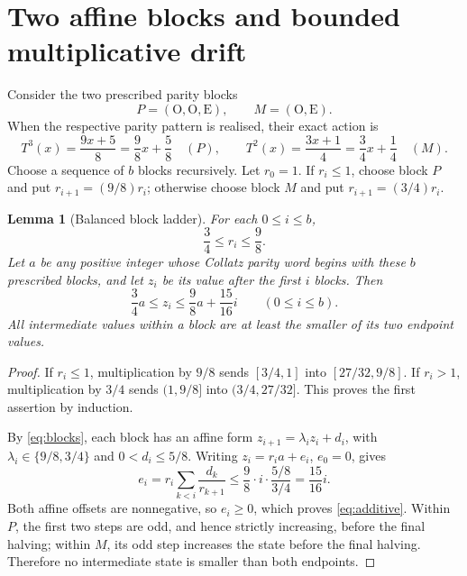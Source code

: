 \documentclass[11pt,a4paper]{article}
\newtheorem{lemma}[theorem]{Lemma}
\begin{document}
\section{Two affine blocks and bounded multiplicative drift}
Consider the two prescribed parity blocks
\[
 P=(\mathrm O,\mathrm O,\mathrm E),\qquad
 M=(\mathrm O,\mathrm E).
\]
When the respective parity pattern is realised, their exact action is
\begin{equation}\label{eq:blocks}
 T^3(x)=\frac{9x+5}{8}=\frac98x+\frac58
 \quad(P),\qquad
 T^2(x)=\frac{3x+1}{4}=\frac34x+\frac14
 \quad(M).
\end{equation}
Choose a sequence of $b$ blocks recursively. Let $r_0=1$.
If $r_i\le1$, choose block $P$ and put $r_{i+1}=(9/8)r_i$;
otherwise choose block $M$ and put $r_{i+1}=(3/4)r_i$.
\begin{lemma}[Balanced block ladder]\label{lem:balance}
For each $0\le i\le b$,
\[
 \frac34\le r_i\le\frac98.
\]
Let $a$ be any positive integer whose Collatz parity word begins
with these $b$ prescribed blocks, and let $z_i$ be its value after
the first $i$ blocks. Then
\begin{equation}\label{eq:additive}
 \frac34a\le z_i\le\frac98a+\frac{15}{16}i
 \qquad(0\le i\le b).
\end{equation}
All intermediate values within a block are at least the smaller
of its two endpoint values.
\end{lemma}
\begin{proof}
If $r_i\le1$, multiplication by $9/8$ sends $[3/4,1]$ into
$[27/32,9/8]$. If $r_i>1$, multiplication by $3/4$ sends
$(1,9/8]$ into $(3/4,27/32]$. This proves the first assertion
by induction.

By \eqref{eq:blocks}, each block has an affine form
$z_{i+1}=\lambda_i z_i+d_i$, with
$\lambda_i\in\{9/8,3/4\}$ and $0<d_i\le5/8$.
Writing $z_i=r_i a+e_i$, $e_0=0$, gives
\[
 e_i=r_i\sum_{k<i}\frac{d_k}{r_{k+1}}
 \le\frac98\cdot i\cdot\frac{5/8}{3/4}=\frac{15}{16}i.
\]
Both affine offsets are nonnegative, so $e_i\ge0$, which proves
\eqref{eq:additive}. Within $P$, the first two steps are odd,
and hence strictly increasing, before the final halving; within
$M$, its odd step increases the state before the final halving.
Therefore no intermediate state is smaller than both endpoints.
\end{proof}
\end{document}
